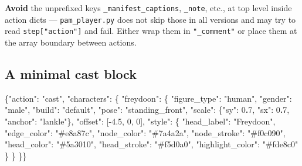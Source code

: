 \documentclass[
  11pt,
]{book}
\newenvironment{Shaded}{}{}
\newcommand{\DataTypeTok}[1]{\textcolor[rgb]{0.56,0.13,0.00}{#1}}
\newcommand{\DecValTok}[1]{\textcolor[rgb]{0.25,0.63,0.44}{#1}}
\newcommand{\ErrorTok}[1]{\textcolor[rgb]{1.00,0.00,0.00}{\textbf{#1}}}
\newcommand{\FloatTok}[1]{\textcolor[rgb]{0.25,0.63,0.44}{#1}}
\newcommand{\FunctionTok}[1]{\textcolor[rgb]{0.02,0.16,0.49}{#1}}
\newcommand{\OtherTok}[1]{\textcolor[rgb]{0.00,0.44,0.13}{#1}}
\newcommand{\StringTok}[1]{\textcolor[rgb]{0.25,0.44,0.63}{#1}}
\begin{document}
\textbf{Avoid} the unprefixed keys \texttt{\_manifest\_captions},
\texttt{\_note}, etc., at top level inside action dicts ---
\texttt{pam\_player.py} does not skip those in all versions and may try
to read \texttt{step{[}"action"{]}} and fail. Either wrap them in
\texttt{"\_comment"} or place them at the array boundary between
actions.

\subsection{A minimal cast block}\label{a-minimal-cast-block}

\begin{Shaded}
\begin{Highlighting}[]
\FunctionTok{\{}\DataTypeTok{"action"}\FunctionTok{:} \StringTok{"cast"}\FunctionTok{,} \DataTypeTok{"characters"}\FunctionTok{:} \FunctionTok{\{}
  \DataTypeTok{"freydoon"}\FunctionTok{:} \FunctionTok{\{}
    \DataTypeTok{"figure\_type"}\FunctionTok{:} \StringTok{"human"}\FunctionTok{,}
    \DataTypeTok{"gender"}\FunctionTok{:}      \StringTok{"male"}\FunctionTok{,}
    \DataTypeTok{"build"}\FunctionTok{:}       \StringTok{"default"}\FunctionTok{,}
    \DataTypeTok{"pose"}\FunctionTok{:}        \StringTok{"standing\_front"}\FunctionTok{,}
    \DataTypeTok{"scale"}\FunctionTok{:}       \FunctionTok{\{}\DataTypeTok{"sy"}\FunctionTok{:} \DecValTok{0}\ErrorTok{.}\DecValTok{7}\FunctionTok{,} \DataTypeTok{"sx"}\FunctionTok{:} \DecValTok{0}\ErrorTok{.}\DecValTok{7}\FunctionTok{,} \DataTypeTok{"anchor"}\FunctionTok{:} \StringTok{"lankle"}\FunctionTok{\},}
    \DataTypeTok{"offset"}\FunctionTok{:}      \OtherTok{[}\FloatTok{{-}4.5}\OtherTok{,} \DecValTok{0}\OtherTok{,} \DecValTok{0}\OtherTok{]}\FunctionTok{,}
    \DataTypeTok{"style"}\FunctionTok{:} \FunctionTok{\{}
      \DataTypeTok{"head\_label"}\FunctionTok{:}   \StringTok{"Freydoon"}\FunctionTok{,}
      \DataTypeTok{"edge\_color"}\FunctionTok{:}   \StringTok{"\#e8a87c"}\FunctionTok{,}
      \DataTypeTok{"node\_color"}\FunctionTok{:}   \StringTok{"\#7a4a2a"}\FunctionTok{,}
      \DataTypeTok{"node\_stroke"}\FunctionTok{:}  \StringTok{"\#f0c090"}\FunctionTok{,}
      \DataTypeTok{"head\_color"}\FunctionTok{:}   \StringTok{"\#5a3010"}\FunctionTok{,}
      \DataTypeTok{"head\_stroke"}\FunctionTok{:}  \StringTok{"\#f5d0a0"}\FunctionTok{,}
      \DataTypeTok{"highlight\_color"}\FunctionTok{:} \StringTok{"\#fde8c0"}
    \FunctionTok{\}}
  \FunctionTok{\}}
\FunctionTok{\}\}}
\end{Highlighting}
\end{Shaded}
\end{document}
